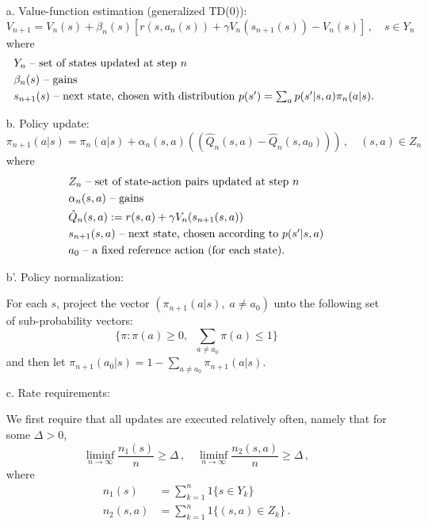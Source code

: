 \begin{itemize}
\item[a.]
Value-function estimation (generalized TD(0)):
$$
V_{n+1}=V_n(s)+\beta_n(s)[r(s,a_n(s))+\gamma V_n(s_{n+1}(s))-V_n(s)]\,,\quad s\in Y_n
$$
where
\begin{align*}
&  Y_n   \mbox{ \rm -- set of states updated at step $n$} \\
&  \beta_n(s)  \mbox{ \rm -- gains }\\
& s_{n+1}(s)  \mbox { \rm -- next state, chosen with distribution\ }
         \mbox{\rm $p(s') = \sum_a p(s'|s,a)\pi_n(a|s)$.
}
\end{align*}

\item[b.] Policy update:
$$
\pi_{n+1}(a|s)=\pi_{n}(a|s) + \alpha_n(s,a) (( \hat{Q}_n(s,a) - \hat{Q}_n(s,a_0) ))\,,
\quad (s,a) \in Z_n
$$
where
\begin{align*}
& Z_n  \mbox{ \rm -- set of state-action pairs  updated at step $n$} \\
& \alpha_n(s,a) \mbox{ \rm -- gains} \\
& \hat{Q}_n(s,a):=r(s,a)+\gamma V_n(s_{n+1}(s,a))\\
& s_{n+1}(s,a) \mbox{ \rm -- next state, chosen according to $p(s'|s,a)$} \\
& a_0 \mbox { \rm -- a fixed reference action (for each state).}
\end{align*}

\item[b'.] Policy normalization:

For each $s$, project the vector $(\pi_{n+1}(a|s),\; a\not= a_0)$ unto the
following set
of sub-probability vectors:
$$
\{\pi: \pi(a)\ge 0,\;\; \sum_{a\not = a_0}\pi(a)\le 1\}
$$
and then let $\pi_{n+1}(a_0|s)=1-\sum_{ a\not = a_0}\pi_{n+1}(a|s) $.


\item[c.] Rate requirements:

We first require that all updates are executed relatively often, namely that for
some $\Delta>0$,
$$
\liminf_{n\to\infty}\frac{n_1(s)}{n} \ge \Delta\,,\quad
\liminf_{n\to\infty}\frac{n_2(s,a)}{n} \ge \Delta\,,
$$
where
\begin{align*}
n_1(s) &= \sum_{k=1}^n 1\{s\in Y_k\} \\
n_2(s,a) &= \sum_{k=1}^n 1\{(s,a) \in Z_k\} \,.
\end{align*}


\end{itemize}
